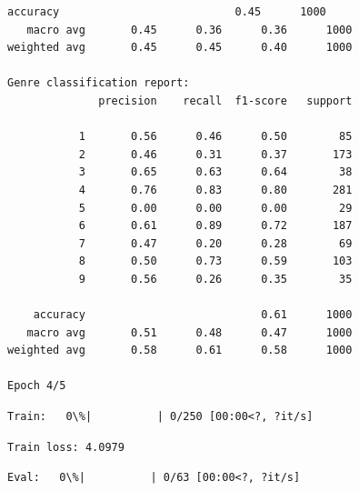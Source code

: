 \documentclass[11pt]{article}
\begin{document}
\begin{Verbatim}[commandchars=\\\{\}]
    accuracy                           0.45      1000
   macro avg       0.45      0.36      0.36      1000
weighted avg       0.45      0.45      0.40      1000

Genre classification report:
              precision    recall  f1-score   support

           1       0.56      0.46      0.50        85
           2       0.46      0.31      0.37       173
           3       0.65      0.63      0.64        38
           4       0.76      0.83      0.80       281
           5       0.00      0.00      0.00        29
           6       0.61      0.89      0.72       187
           7       0.47      0.20      0.28        69
           8       0.50      0.73      0.59       103
           9       0.56      0.26      0.35        35

    accuracy                           0.61      1000
   macro avg       0.51      0.48      0.47      1000
weighted avg       0.58      0.61      0.58      1000

Epoch 4/5
    \end{Verbatim}

    
    \begin{Verbatim}[commandchars=\\\{\}]
Train:   0\%|          | 0/250 [00:00<?, ?it/s]
    \end{Verbatim}

    
    \begin{Verbatim}[commandchars=\\\{\}]
Train loss: 4.0979
    \end{Verbatim}

    
    \begin{Verbatim}[commandchars=\\\{\}]
Eval:   0\%|          | 0/63 [00:00<?, ?it/s]
    \end{Verbatim}
\end{document}
